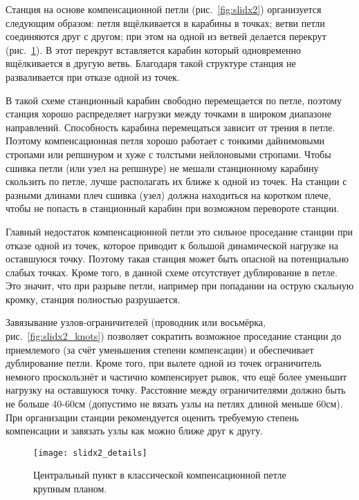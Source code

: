 \documentclass[fleqn, 12pt]{extarticle}
\begin{document}
    Станция на основе компенсационной петли (рис.~\ref{fig:slidx2}) организуется следующим образом: петля вщёлкивается в карабины в точках; ветви петли соединяются друг с другом;
    при этом на одной из ветвей делается перекрут (рис.~\ref{fig:slidx2_details}). В этот перекрут вставляется карабин который одновременно вщёлкивается в другую ветвь.
    Благодаря такой структуре станция не разваливается при отказе одной из точек. 
    
    В такой схеме станционный карабин свободно перемещается по петле, поэтому станция хорошо распределяет
    нагрузки между точками в широком диапазоне направлений.
    Способность карабина перемещаться зависит от трения в петле. Поэтому компенсационная петля хорошо работает с тонкими дайнимовыми стропами или репшнуром и хуже
    с толстыми нейлоновыми стропами. Чтобы сшивка петли (или узел на репшнуре) не мешали станционному карабину скользить по петле, лучше располагать их ближе к одной из точек.
    На станции с разными длинами плеч сшивка (узел) должна находиться на коротком плече, чтобы не попасть в станционный карабин при возможном перевороте станции.
    
	Главный недостаток компенсационной петли это сильное проседание станции при отказе одной из точек, которое приводит к большой динамической нагрузке на оставшуюся точку.
    Поэтому такая станция может быть опасной на потенциально слабых точках. Кроме того, в данной схеме отсутствует дублирование в петле. Это значит, что при разрыве петли, например
    при попадании на острую скальную кромку, станция полностью разрушается.
    
    Завязывание узлов-ограничителей (проводник или восьмёрка, рис.~\ref{fig:slidx2_knots}) позволяет сократить возможное проседание станции до приемлемого (за счёт уменьшения степени компенсации)
    и обеспечивает дублирование петли. Кроме того, при вылете одной из точек ограничитель немного проскользнёт
    и частично компенсирует рывок, что ещё более уменьшит нагрузку на оставшуюся точку.
    Расстояние между ограничителями должно быть не больше 40-60см (допустимо не вязать узлы на петлях длиной меньше 60см).
    При организации станции рекомендуется оценить требуемую степень компенсации и завязать узлы как можно ближе друг к другу.
    
    \begin{figure}
        \centering
        \texttt{[image: slidx2\_details]}
        \caption{Центральный пункт в классической компенсационной петле крупным планом.}\label{fig:slidx2_details}
    \end{figure}
    
\end{document}
